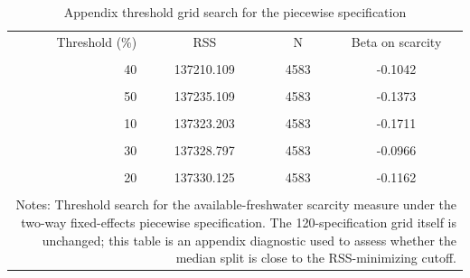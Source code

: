 \begin{table}[htbp]
\centering
\caption{Appendix threshold grid search for the piecewise specification}
\label{tab:threshold_grid}
\small
\begin{tabular}{rccc}
\toprule
Threshold (\%) & RSS & N & Beta on scarcity \\\\
\midrule
40 & 137210.109 & 4583 & -0.1042 \\\\
50 & 137235.109 & 4583 & -0.1373 \\\\
10 & 137323.203 & 4583 & -0.1711 \\\\
30 & 137328.797 & 4583 & -0.0966 \\\\
20 & 137330.125 & 4583 & -0.1162 \\\\
\bottomrule
\multicolumn{4}{p{0.9\textwidth}}{\footnotesize Notes: Threshold search for the available-freshwater scarcity measure under the two-way fixed-effects piecewise specification. The 120-specification grid itself is unchanged; this table is an appendix diagnostic used to assess whether the median split is close to the RSS-minimizing cutoff.}
\end{tabular}
\end{table}
